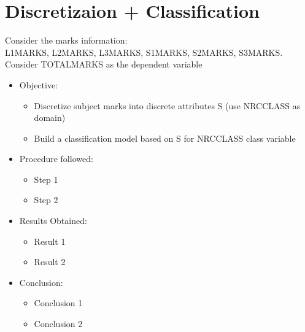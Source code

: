 \chapter{Discretizaion + Classification}
Consider the marks information: \\
L1\textunderscore MARKS, L2\textunderscore MARKS, L3\textunderscore MARKS, S1\textunderscore MARKS, S2\textunderscore MARKS, S3\textunderscore MARKS. Consider TOTAL\textunderscore MARKS as the dependent variable
\begin{itemize}
	\item
	Objective:
	\begin{itemize}
		\item
		Discretize subject marks into discrete attributes S (use NRC\textunderscore CLASS as domain)
		\item
		Build a classification model based on S for NRC\textunderscore CLASS class variable
	\end{itemize}
	
	\item
	Procedure followed: 
	\begin{itemize}
		\item
		Step 1
		\item
		Step 2
	\end{itemize}
	
	\item
	Results Obtained:
	\begin{itemize}
		\item
		Result 1
		\item
		Result 2
	\end{itemize}
	
	\item
	Conclusion:
	\begin{itemize}
		\item
		Conclusion 1
		\item
		Conclusion 2
	\end{itemize}
\end{itemize}